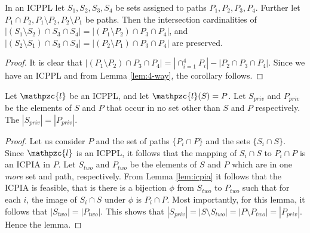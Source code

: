 \documentclass[envcountsect, envcountsame, 11pt]{../lib/llncs2e/llncs}
\def\cl{\mathpzc{l}}
\begin{document}
\begin{corollary} \label{corr:4-way}
In an ICPPL let $S_1, S_2, S_3, S_4$ be sets assigned to paths $P_1, P_2, P_3, P_4$.  Further let $P_1 \cap P_2, P_1 \setminus P_2, P_2 \setminus P_1$ be paths.  Then the intersection cardinalities of $|(S_1 \setminus S_2) \cap S_3 \cap S_4|=|(P_1 \setminus P_2) \cap P_3 \cap P_4|$, and $|(S_2 \setminus S_1) \cap S_3 \cap S_4|= |(P_2 \setminus P_1) \cap P_3 \cap P_4|$
are preserved.
\end{corollary}
\begin{proof}
 It is clear that $|(P_1 \setminus P_2) \cap P_3 \cap P_4| = |\displaystyle \cap_{i=1}^4 P_i| - | P_2 \cap P_3 \cap P_4|$.  Since we have an ICPPL and from Lemma \ref{lem:4-way}, the corollary follows.
\end{proof}
\begin{lemma}
\label{lem:priv-card}
Let $\cl$ be an ICPPL, and let  $\cl(S)=P$.  Let $S_{priv}$ and $P_{priv}$ be the elements of $S$ and $P$ that occur in no  set  other than $S$ and $P$ respectively.
The $|S_{priv}|=|P_{priv}|$.
\end{lemma}
\begin{proof}
Let us consider $P$ and the set of paths $\{P_i \cap P\}$ and the sets $\{S_i \cap S\}$.  Since $\cl$ is an ICPPL, it follows that the mapping of $S_i \cap S$ to $P_i \cap P$ is
an ICPIA in $P$.     Let $S_{two}$ and $P_{two}$ be the elements of $S$ and $P$ which are in one {\em more} set and path, respectively.    From Lemma \ref{lem:icpia} it follows that the ICPIA is feasible, that is there is 
a bijection $\phi$ from $S_{two}$ to $P_{two}$ such that for each $i$, the image of $S_i \cap S$ under $\phi$ is $P_i \cap P$.  Most importantly, for this lemma, it follows that $|S_{two}| = |P_{two}|$.  
 This shows that $|S_{priv}| = |S \setminus S_{two}| = |P \setminus P_{two}|=|P_{priv}|$.   Hence the lemma.
 \end{proof}
\end{document}
